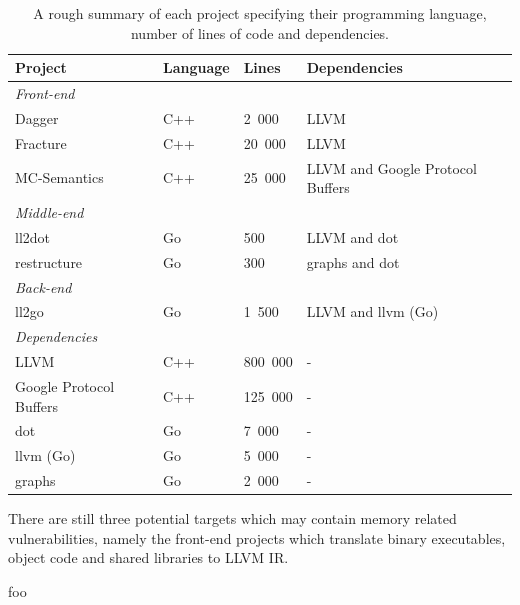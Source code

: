 \begin{table}[htbp]
	\begin{center}
		\begin{tabular}{|l|l|l|l|}
			\hline
			\textbf{Project} & \textbf{Language} & \textbf{Lines} & \textbf{Dependencies} \\
			\hline
			\multicolumn{4}{|l|}{\hspace{4ex} \textit{Front-end}} \\
			\hline
			Dagger & C++ & 2~000 & LLVM \\
			Fracture & C++ & 20~000 & LLVM \\
			MC-Semantics & C++ & 25~000 & LLVM and Google Protocol Buffers \\
			\hline
			\multicolumn{4}{|l|}{\hspace{4ex} \textit{Middle-end}} \\
			\hline
			ll2dot & Go & 500 & LLVM and dot \\
			restructure & Go & 300 & graphs and dot \\
			\hline
			\multicolumn{4}{|l|}{\hspace{4ex} \textit{Back-end}} \\
			\hline
			ll2go & Go & 1~500 & LLVM and llvm (Go) \\
			\hline
			\multicolumn{4}{|l|}{\hspace{4ex} \textit{Dependencies}} \\
			\hline
			LLVM & C++ & 800~000 & - \\
			Google Protocol Buffers & C++ & 125~000 & - \\
			dot & Go & 7~000 & - \\
			llvm (Go) & Go & 5~000 & - \\
			graphs & Go & 2~000 & - \\
			\hline
		\end{tabular}
	\end{center}
	\caption{A rough summary of each project specifying their programming language, number of lines of code and dependencies.}
	\label{tbl:loc_summary}
\end{table}

There are still three potential targets which may contain memory related vulnerabilities, namely the front-end projects which translate binary executables, object code and shared libraries to LLVM IR.

foo



